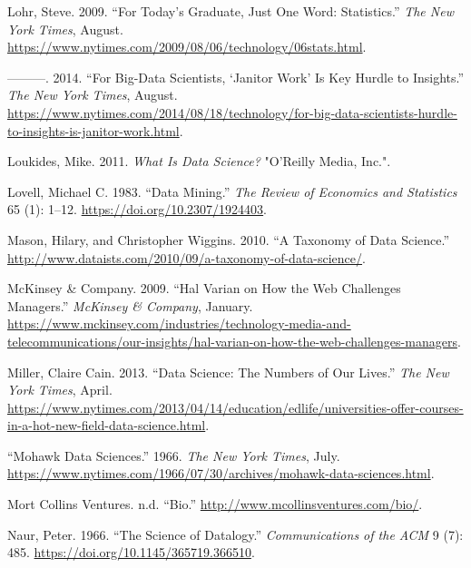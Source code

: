 \documentclass[
  letterpaper,
]{report}
\newlength{\cslhangindent}
\newlength{\cslentryspacingunit} %
\newenvironment{CSLReferences}[2] %
 {%
  \setlength{\parindent}{0pt}
  \ifodd #1
  \let\oldpar\par
  \def\par{\hangindent=\cslhangindent\oldpar}
  \fi
  \setlength{\parskip}{#2\cslentryspacingunit}
 }%
 {}
\begin{document}
\begin{CSLReferences}{1}{0}
\leavevmode{}%
Lohr, Steve. 2009. {``For Today{'}s Graduate, Just One Word:
Statistics.''} \emph{The New York Times}, August.
\url{https://www.nytimes.com/2009/08/06/technology/06stats.html}.

\leavevmode{}%
---------. 2014. {``For Big-Data Scientists, {`}Janitor Work{'} Is Key
Hurdle to Insights.''} \emph{The New York Times}, August.
\url{https://www.nytimes.com/2014/08/18/technology/for-big-data-scientists-hurdle-to-insights-is-janitor-work.html}.

\leavevmode{}%
Loukides, Mike. 2011. \emph{What Is Data Science?} {"}O'Reilly Media,
Inc.{"}.

\leavevmode{}%
Lovell, Michael C. 1983. {``Data Mining.''} \emph{The Review of
Economics and Statistics} 65 (1): 1--12.
\url{https://doi.org/10.2307/1924403}.

\leavevmode{}%
Mason, Hilary, and Christopher Wiggins. 2010. {``A Taxonomy of Data
Science.''}
\url{http://www.dataists.com/2010/09/a-taxonomy-of-data-science/}.

\leavevmode{}%
McKinsey \& Company. 2009. {``Hal Varian on How the Web Challenges
Managers.''} \emph{McKinsey \& Company}, January.
\url{https://www.mckinsey.com/industries/technology-media-and-telecommunications/our-insights/hal-varian-on-how-the-web-challenges-managers}.

\leavevmode{}%
Miller, Claire Cain. 2013. {``Data Science: The Numbers of Our Lives.''}
\emph{The New York Times}, April.
\url{https://www.nytimes.com/2013/04/14/education/edlife/universities-offer-courses-in-a-hot-new-field-data-science.html}.

\leavevmode{}%
{``Mohawk Data Sciences.''} 1966. \emph{The New York Times}, July.
\url{https://www.nytimes.com/1966/07/30/archives/mohawk-data-sciences.html}.

\leavevmode{}%
Mort Collins Ventures. n.d. {``Bio.''}
\url{http://www.mcollinsventures.com/bio/}.

\leavevmode{}%
Naur, Peter. 1966. {``The Science of Datalogy.''} \emph{Communications
of the ACM} 9 (7): 485. \url{https://doi.org/10.1145/365719.366510}.


\end{CSLReferences}
\end{document}
